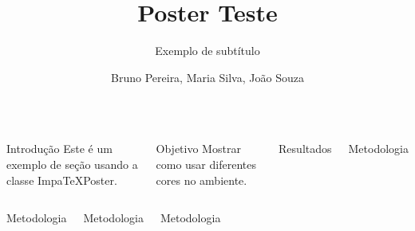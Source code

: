 \documentclass[palette=yellow,mode=light]{impaTeXPoster}
\title{Poster Teste}
\subtitle{Exemplo de subtítulo}
\author{Bruno Pereira, Maria Silva, João Souza}
\begin{document}
\maketitle

\begin{columns}


\begin{postercard}{Introdução}
Este é um exemplo de seção usando a classe ImpaTeXPoster.

\lipsum[1]
\end{postercard}

\begin{postercard}{Objetivo}
Mostrar como usar diferentes cores no ambiente.

\lipsum[2]
\end{postercard}


\begin{postercard}{Resultados}
\lipsum[3]
\end{postercard}


\begin{postercard}{Metodologia}
\lipsum[4]
\end{postercard}

\end{columns}

\begin{columns}


\begin{postercard}{Metodologia}
\lipsum[5]
\end{postercard}


\begin{postercard}{Metodologia}
\lipsum[6]
\end{postercard}



\begin{postercard}{Metodologia}
\lipsum[7]
\end{postercard}

\end{columns}


\end{document}
